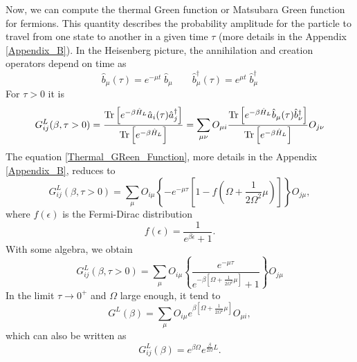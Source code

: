 Now, we can compute the thermal Green function or Matsubara Green function for fermions. This quantity describes the probability amplitude for the particle to travel from one state to another in a given time $\tau$ (more details in the Appendix \ref{Appendix_B}).
In the Heisenberg picture, the annihilation and creation operators depend on time \cite{Coleman_2015} as
\begin{equation}
    \hat b_\mu (\tau) = e^{-\mu t}\; \hat b_\mu \qquad \hat b_\mu^\dagger (\tau) = e^{\mu t} \;\hat b_\mu^\dagger
\end{equation}
For $\tau > 0$ it is
\begin{equation}\label{Thermal_GReen_Function}
    \begin{split}
        G^L_{ij}(\beta, \tau > 0) &= \frac{\operatorname{Tr}\left[e^{-\beta \hat H_L}\hat a_i (\tau)  \hat a_j^\dagger\right]}{\operatorname{Tr}\left[e^{-\beta \hat H_L}\right]} =\sum_{\mu\nu} O_{\mu i}\frac{\operatorname{Tr}\left[ e^{-\beta \hat H_L} \hat b_\mu (\tau)\hat b_\nu^\dagger\right]}{\operatorname{Tr}\left[e^{-\beta \hat H_L}\right]}O_{j\nu}\\
    \end{split}
\end{equation}
The equation \eqref{Thermal_GReen_Function}, more details in the Appendix \ref{Appendix_B}, reduces to
\begin{equation}
    G^L_{ij}(\beta, \tau > 0) = \sum_{\mu} O_{i\mu}\left\{-e^{-\mu \tau}\left[1-f\left( \Omega + \frac{1}{2\Omega^2}\mu\right)\right]\right\}O_{j\mu},
\end{equation} 
where $f(\epsilon)$ is the Fermi-Dirac distribution
\begin{equation}
    f(\epsilon)=\frac{1}{e^{\beta\epsilon} + 1}.
\end{equation}
With some algebra, we obtain
\begin{equation}
    G^L_{ij}(\beta, \tau > 0) = \sum_{\mu} O_{i\mu}\left\{\frac{e^{-\mu \tau}}{e^{-\beta\left[ \Omega + \frac{1}{2\Omega^2}\mu\right]} + 1}\right\}O_{j\mu}
\end{equation}
In the limit $\tau \rightarrow 0^+$ and $\Omega$ large enough, it tend to
\begin{equation}\label{Quantum_correlation}
    G^L(\beta) = \sum_{\mu} O_{i\mu}{e^{\beta\left[ \Omega + \frac{1}{2\Omega^2}\mu\right]}} O_{\mu i},
\end{equation}
which can also be written as
\begin{equation}\label{quantum_correlation_2}
    G^L_{ij}(\beta)= e^{\beta \Omega}e^{\frac{\beta}{2\Omega}L}.
\end{equation}


